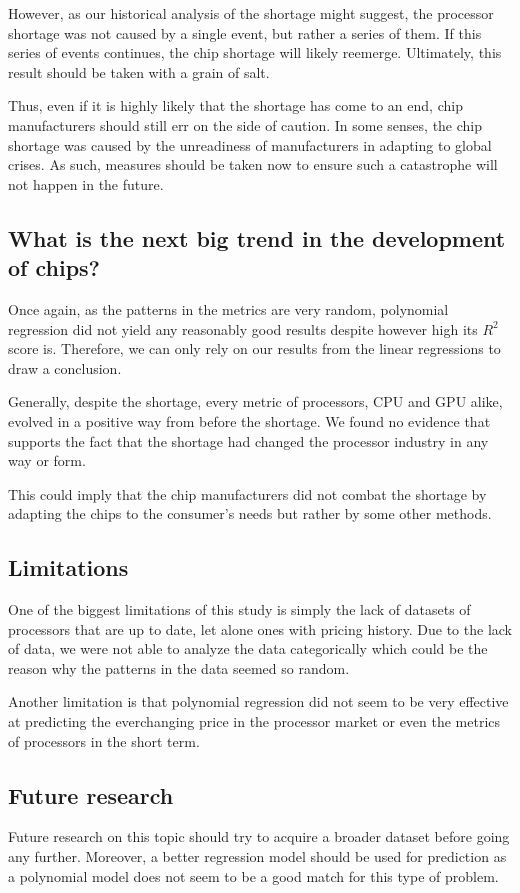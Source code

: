 \documentclass[conference]{IEEEtran}
\begin{document}
However, as our historical
analysis of the shortage might suggest, the processor shortage was not caused
by a single event, but rather a series of them. If this series of events
continues, the chip shortage will likely reemerge. Ultimately,
this result should be taken with a grain of salt.

Thus, even if it is highly likely that the shortage has come to an end, chip
manufacturers should still err on the side of caution. In some senses, the
chip shortage was caused by the unreadiness of manufacturers in adapting to
global crises. As such, measures should be taken now to ensure such a
catastrophe will not happen in the future.

\subsection{What is the next big trend in the development of chips?}
Once again, as the patterns in the metrics are very random, polynomial
regression did not yield any reasonably good results despite however high
its $R^{2}$ score is. Therefore, we can only rely on our results from the linear
regressions to draw a conclusion.

Generally, despite the shortage, every metric of processors, CPU and GPU alike,
evolved in a positive way from before the shortage. We found no evidence that
supports the fact that the shortage had changed the processor industry in any
way or form.

This could imply that the chip manufacturers did not combat the shortage by
adapting the chips to the consumer’s needs but rather by some other methods.

\subsection{Limitations}
One of the biggest limitations of this study is simply the lack of datasets of
processors that are up to date, let alone ones with pricing history. Due to
the lack of data, we were not able to analyze the data categorically which
could be the reason why the patterns in the data seemed so random.

Another limitation is that polynomial regression did not seem to be very
effective at predicting the everchanging price in the processor market or
even the metrics of processors in the short term.

\subsection{Future research}
Future research on this topic should try to acquire a broader dataset before
going any further. Moreover, a better regression model should be used for
prediction as a polynomial model does not seem to be a good match for this
type of problem.
\end{document}
